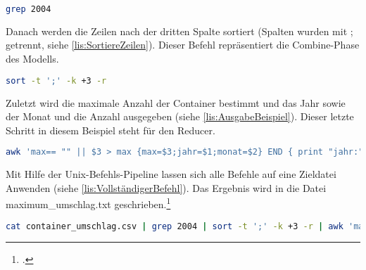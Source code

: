 \begin{lstlisting}[language=bash, caption=Befehl zur Anzeige aller Zeilen mit Jahr 2004, title=\autoref*{lis:Grep2004}: Befehl zur Anzeige aller Zeilen mit Jahr 2004\protect\footnotemark, label=lis:Grep2004]
grep 2004
\end{lstlisting}

Danach werden die Zeilen nach der dritten Spalte sortiert (Spalten wurden mit ; getrennt, siehe \autoref{lis:SortiereZeilen}). Dieser Befehl repräsentiert die Combine-Phase des Modells. \\

\begin{lstlisting}[language=bash, caption=Befehl zur Sortierung der Zeilen nach der dritten Spalte, title=\autoref*{lis:SortiereZeilen}: Befehl zur Sortierung der Zeilen nach der dritten Spalte\protect\footnotemark, label=lis:SortiereZeilen]
sort -t ';' -k +3 -r
\end{lstlisting}

Zuletzt wird die maximale Anzahl der Container bestimmt und das Jahr sowie der Monat und die Anzahl ausgegeben (siehe \autoref{lis:AusgabeBeispiel}). Dieser letzte Schritt in diesem Beispiel steht für den Reducer. \\

\begin{lstlisting}[language=bash, caption=Ausgabe des Beispielprogramms, title=\autoref*{lis:AusgabeBeispiel}: Ausgabe des Beispielprogramms\protect\footnotemark, label=lis:AusgabeBeispiel]
awk 'max== "" || $3 > max {max=$3;jahr=$1;monat=$2} END { print "jahr:" jahr; print "monat:" monat; print "anzahl:" max;}' FS=";"
\end{lstlisting}

Mit Hilfe der Unix-Befehls-Pipeline lassen sich alle Befehle auf eine Zieldatei Anwenden (siehe \autoref{lis:VollständigerBefehl}). Das Ergebnis wird in die Datei maximum\_umschlag.txt geschrieben.\footcite[Vgl.][S. 26 ff]{Wartala.2012} \\

\begin{lstlisting}[language=bash, caption=Vollständiger Befehl zur Auswertung der Beispieldaten, title=\autoref*{lis:VollständigerBefehl}: Vollständiger Befehl zur Auswertung der Beispieldaten\protect\footnotemark, label=lis:VollständigerBefehl]
cat container_umschlag.csv | grep 2004 | sort -t ';' -k +3 -r | awk 'max== "" || $3 > max {max=$3;jahr=$1;monat=$2} END { print "jahr:" jahr; print "monat:" monat; print "anzahl:" max;}' FS=";" | cat > maximum_umschlag.txt
\end{lstlisting}

